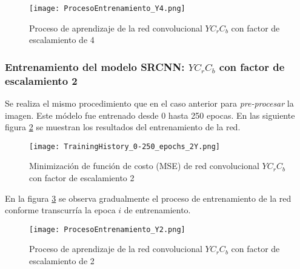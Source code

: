 \begin{figure}[H]
    \centering
    \texttt{[image: ProcesoEntrenamiento\_Y4.png]}
    \caption{Proceso de aprendizaje de la red convolucional $YC_rC_b$ con factor de escalamiento de 4}
    \label{fig:SRCNN_MSE_TrainingProcess4Y}
\end{figure}

\subsubsection{Entrenamiento del modelo SRCNN: $YC_rC_b$ con factor de escalamiento 2}
Se realiza el mismo procedimiento que en el caso anterior para \emph{pre-procesar} la imagen.
Este módelo fue entrenado desde 0 hasta 250 epocas. En las siguiente figura \ref{fig:SRCNN_MSE_TrainingLoss2Y} se muestran los
resultados del entrenamiento de la red.

\begin{figure}[H]
    \centering
    \texttt{[image: TrainingHistory\_0-250\_epochs\_2Y.png]}
    \caption{Minimización de función de costo (MSE) de red convolucional $YC_rC_b$ con factor de escalamiento 2}
    \label{fig:SRCNN_MSE_TrainingLoss2Y}
\end{figure}

En la figura \ref{fig:SRCNN_MSE_TrainingProcess2Y} se observa gradualmente el proceso de entrenamiento de la red conforme
transcurría la epoca $i$ de entrenamiento.

\begin{figure}[H]
    \centering
    \texttt{[image: ProcesoEntrenamiento\_Y2.png]}
    \caption{Proceso de aprendizaje de la red convolucional $YC_rC_b$ con factor de escalamiento de 2}
    \label{fig:SRCNN_MSE_TrainingProcess2Y}
\end{figure}